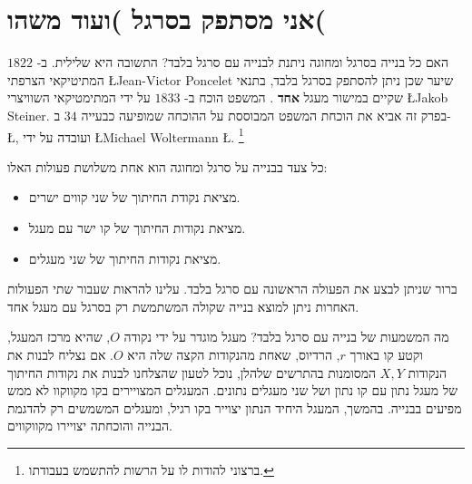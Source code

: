 

\chapter{אני מסתפק בסרגל )ועוד משהו(}



האם כל בנייה בסרגל ומחוגה ניתנת לבנייה עם סרגל בלבד? התשובה היא שלילית. ב-%
$1822$
המתיטיקאי הצרפתי
\L{Jean-Victor Poncelet}
שיער שכן ניתן להסתפק בסרגל בלבד, בתנאי שקיים במישור מעגל
\textbf{%
אחד%
}.
המשפט הוכח ב-
$1833$
על ידי המתימטיקאי השוויצרי
\L{Jakob Steiner}.
בפרק זה אביא את הוכחת המשפט המבוססת על ההוכחה שמופיעה כבעייה
$34$
ב-%
\L{\cite{dorrie1}},
ועובדה על ידי
\L{Michael Woltermann} \L{\cite{dorrie2}}.%
\footnote{%
ברצוני להודות לו על הרשות להתשמש בעבודתו.
}



כל צעד בבנייה על סרגל ומחוגה הוא אחת משלושת פעולות האלו:
\begin{itemize}
\setlength{\itemsep}{0pt}
\item
מציאת נקודת החיתוך של שני קווים ישרים.
\item
מציאת נקודות החיתוך של קו ישר עם מעגל.
\item
מציאת נקודות החיתוך של שני מעגלים.
\end{itemize}
ברור שניתן לבצע את הפעולה הראשונה עם סרגל בלבד. עלינו להראות שעבור שתי הפעולות האחרות ניתן למוצא בנייה שקולה המשתמשת רק בסרגל עם מעגל אחד.


מה המשמעות של בנייה עם סרגל בלבד? מעגל מוגדר על ידי נקודה
$O$,
שהיא מרכז המעגל, וקטע קו באורך
$r$,
הרדיוס, שאחת מהנקודות הקצה שלה היא
$O$.
אם נצליח לבנות את הנקודות
$X,Y$
המסומנות בהתרשים שלהלן, נוכל לטעון שהצלחנו לבנות את נקודות החיתוך של מעגל נתון עם קו נתון ושל שני מעגלים נתונים. המעגלים המצויירים בקו מקווקוו לא ממש מפיעים בבנייה. בהמשך, המעגל היחיד הנתון יצוייר בקו רגיל, ומעגלים המשמשים רק להדגמת הבנייה והוכחתה יצויירו מקווקווים.


